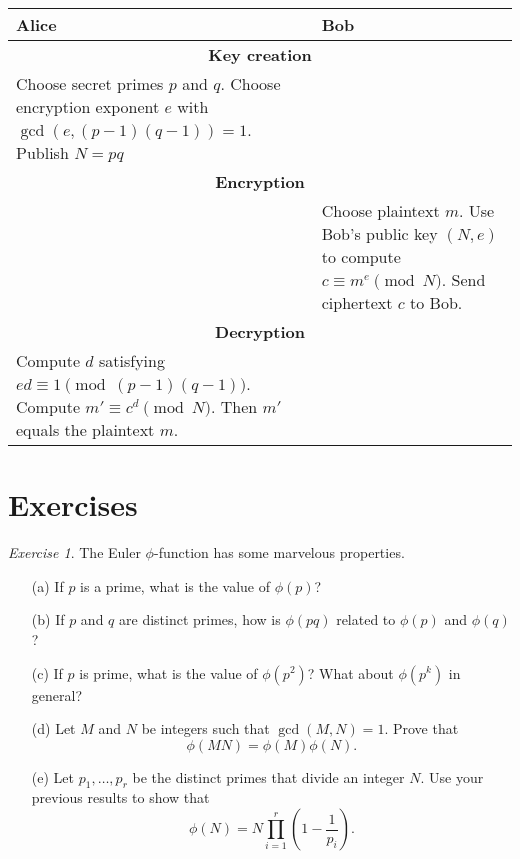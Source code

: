 \documentclass{article}
\theoremstyle{definition}
\theoremstyle{remark}
\newtheorem{exercise}{Exercise}
\begin{document}
    \begin{table}[h!]
        \centering
        \begin{tabular}{|p{5cm}|p{5cm}|}
            \hline
            \textbf{Alice} & \textbf{Bob}\\
            \hline\hline
            \multicolumn{2}{|c|}{\bf Key creation}\\
            \hline
            Choose secret primes \(p\) and \(q\).
            Choose encryption exponent \(e\) with \(\gcd(e,(p-1)(q-1))=1\).
            Publish \(N=pq\) &\\
            \hline
            \multicolumn{2}{|c|}{\bf Encryption}\\
            \hline
            & Choose plaintext \(m\).
            Use Bob's public key \((N,e)\) to compute \(c\equiv m^e\pmod{N}\).
            Send ciphertext \(c\) to Bob.\\
            \hline
            \multicolumn{2}{|c|}{\bf Decryption}\\
            \hline
            Compute \(d\) satisfying \(ed\equiv 1\pmod{(p-1)(q-1)}\).
            Compute \(m' \equiv c^d\pmod{N}\).
            Then \(m'\) equals the plaintext \(m\).&\\
            \hline
        \end{tabular}
    \end{table}

\section{Exercises}

    \begin{exercise}
        The Euler \(\phi\)-function has some marvelous properties.
        \begin{enumerate}
            \item[(a)] If \(p\) is a prime, what is the value of \(\phi(p)\)?
            \item[(b)] If \(p\) and \(q\) are distinct primes, how is \(\phi(pq)\) related to \(\phi(p)\) and \(\phi(q)\)?
            \item[(c)] If \(p\) is prime, what is the value of \(\phi(p^2)\)?
            What about \(\phi(p^k)\) in general?
            \item[(d)] Let \(M\) and \(N\) be integers such that \(\gcd(M,N)=1\).
            Prove that
            \[\phi(MN) = \phi(M)\phi(N).\]
            \item[(e)] Let \(p_1,\ldots,p_r\) be the distinct primes that divide an integer \(N\). 
            Use your previous results to show that 
            \[\phi(N) = N\prod_{i=1}^r\left(1-\frac{1}{p_i}\right).\]
        \end{enumerate}
    \end{exercise}
\end{document}
